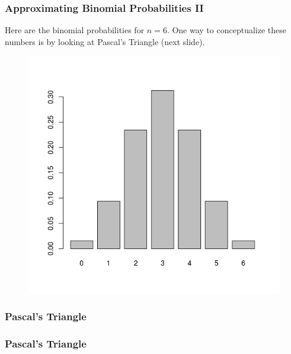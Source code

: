 \documentclass[xcolor=dvipsnames]{beamer}
\begin{document}
\begin{frame}
  \frametitle{Approximating Binomial Probabilities II}
Here are the binomial probabilities for $n=6$. One way to
conceptualize these numbers is by looking at Pascal's Triangle (next
slide). 
  \begin{figure}[h]
    \includegraphics[scale=.5]{./diagrams/binomial1.png}
  \end{figure}
\end{frame}

\begin{frame}
  \frametitle{Pascal's Triangle}
\end{frame}

\begin{frame}
  \frametitle{Pascal's Triangle}
\end{frame}
\end{document}
